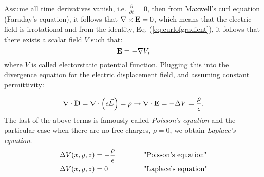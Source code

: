 \documentclass[11pt,a4paper]{report}
\def\Nabla{\ensuremath\bm{\nabla}}
\def\bm{\ensuremath\mathbf}
\def\curl{\ensuremath\Nabla\times}
\def\div{\ensuremath\Nabla\cdot}
\def\lap{\ensuremath\Delta}
\begin{document}
Assume all time derivatives vanish, i.e. $\frac{\partial }{\partial t} = 0  $, then from Maxwell's curl equation (Faraday's equation), it follows that $\curl \bm{E} = 0 $, which means that the electric field is irrotational and from the
identity, Eq. (\ref{eq:curlofgradient}), it follows that there exists a scalar field $V$ such that:
\begin{equation*}
  \bm{E}=-\Nabla V, 
\end{equation*}
where $V$ is called electorstatic potential function. Plugging this into the divergence equation for the electric displacement field, and assuming constant permittivity:

\begin{equation*}
  \div \bm{D} = \div \left ( \epsilon \vec {E} \right ) = \rho \rightarrow \div \bm{E} = -\lap {V}=\frac{\rho}{\epsilon}.
\end{equation*}
The last of the above terms is famously called \emph{Poisson's equation} and the particular case when there are no free charges, $\rho = 0 $, we obtain \emph{Laplace's equation}.
\begin{alignat}{2}
  \lap V(x,y,z) &= -\frac{\rho}{\epsilon}  &\quad\quad\quad &\text{"Poisson's equation"}  \label{eq:possonequation}\\
  \lap V(x,y,z) &= 0  &\quad\quad\quad &\text{"Laplace's equation"} \label{eq:laplaceequation}
\end{alignat}
\\ 
\end{document}
